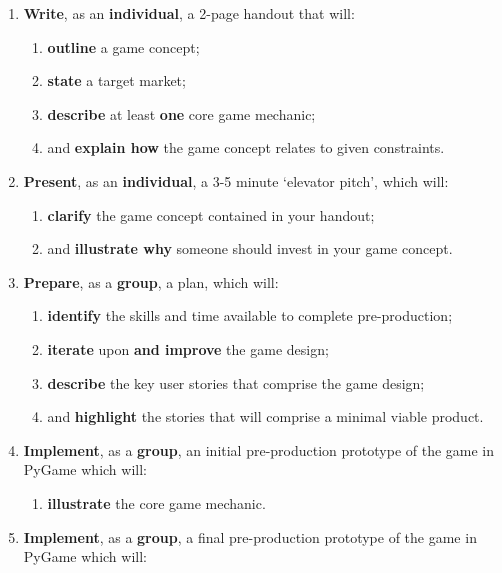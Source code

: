 \documentclass{../../fal_assignment}
\begin{document}
\begin{enumerate}[label=(\Alph*)]
    \item \textbf{Write}, as an \textbf{individual}, a 2-page handout that will:
    	\begin{enumerate}[label=\roman*.]
    		\item \textbf{outline} a game concept;
    		\item \textbf{state} a target market;
    		\item \textbf{describe} at least \textbf{one} core game mechanic;
    		\item and \textbf{explain how} the game concept relates to given constraints.
	\end{enumerate}
    \item \textbf{Present}, as an \textbf{individual}, a 3-5 minute `elevator pitch', which will:
    	\begin{enumerate}[label=\roman*.]
    		\item \textbf{clarify} the game concept contained in your handout;
    		\item and \textbf{illustrate why} someone should invest in your game concept.
	\end{enumerate}
    \item \textbf{Prepare}, as a \textbf{group}, a plan, which will:
    	\begin{enumerate}[label=\roman*.]
    	    	\item \textbf{identify} the skills and time available to complete pre-production;
    	    	\item \textbf{iterate} upon \textbf{and improve} the game design;
    		\item \textbf{describe} the key user stories that comprise the game design;
    		\item and \textbf{highlight} the stories that will comprise a minimal viable product.
	\end{enumerate}
    \item \textbf{Implement}, as a \textbf{group}, an initial pre-production prototype of the game in PyGame which will:
    	\begin{enumerate}[label=\roman*.]
    		\item \textbf{illustrate} the core game mechanic.
	\end{enumerate}
    \item \textbf{Implement}, as a \textbf{group}, a final pre-production prototype of the game in PyGame which will:
    	\begin{enumerate}[label=\roman*.]

\end{enumerate}
\end{enumerate}
\end{document}
